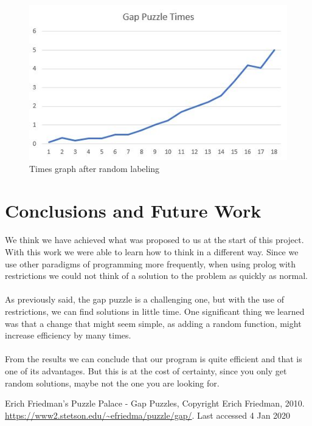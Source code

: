 \documentclass[runningheads]{llncs}
\begin{document}
\begin{figure}
    \begin{center}
        \includegraphics[scale=0.5]{images/graph2.png}
        \caption{Times graph after random labeling} \label{fig5}
    \end{center}
\end{figure}



\section{Conclusions and Future Work}
\paragraph{}
We think we have achieved what was proposed to us at the start of this project. With this work we were able to learn how to think in a different way.
Since we use other paradigms of programming more frequently, when using prolog with restrictions we could not think of a solution to the problem as quickly as normal.
\paragraph{}
As previously said, the gap puzzle is a challenging one, but with the use of restrictions, we can find solutions in little time.
One significant thing we learned was that a change that might seem simple, as adding a random function, might increase efficiency by many times.
\paragraph{}
From the results we can conclude that our program is quite efficient and that is one of its advantages. But this is at the cost of certainty, since you only get random
solutions, maybe not the one you are looking for.

\begin{thebibliography}{8}
    Erich Friedman's Puzzle Palace - Gap Puzzles, Copyright Erich Friedman, 2010.
    \url{https://www2.stetson.edu/~efriedma/puzzle/gap/}.
    Last accessed 4 Jan 2020
    \end{thebibliography}
\end{document}
